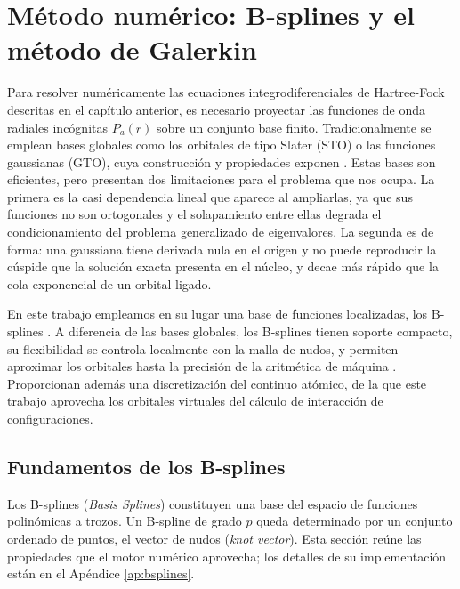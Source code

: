 \chapter{Método numérico: B-splines y el método de Galerkin}
\label{ch:bsplines-galerkin}

Para resolver numéricamente las ecuaciones integrodiferenciales de Hartree-Fock descritas en el capítulo anterior, es necesario proyectar las funciones de onda radiales incógnitas $P_a(r)$ sobre un conjunto base finito. Tradicionalmente se emplean bases globales como los orbitales de tipo Slater (STO) o las funciones gaussianas (GTO), cuya construcción y propiedades exponen \textcite{Szabo1989}. Estas bases son eficientes, pero presentan dos limitaciones para el problema que nos ocupa. La primera es la casi dependencia lineal que aparece al ampliarlas, ya que sus funciones no son ortogonales y el solapamiento entre ellas degrada el condicionamiento del problema generalizado de eigenvalores. La segunda es de forma: una gaussiana tiene derivada nula en el origen y no puede reproducir la cúspide que la solución exacta presenta en el núcleo, y decae más rápido que la cola exponencial de un orbital ligado.

En este trabajo empleamos en su lugar una base de funciones localizadas, los B-splines \parencite{deBoor1978}. A diferencia de las bases globales, los B-splines tienen soporte compacto, su flexibilidad se controla localmente con la malla de nudos, y permiten aproximar los orbitales hasta la precisión de la aritmética de máquina \parencite{Bachau2001}. Proporcionan además una discretización del continuo atómico, de la que este trabajo aprovecha los orbitales virtuales del cálculo de interacción de configuraciones.

\section{Fundamentos de los B-splines}

Los B-splines (\textit{Basis Splines}) constituyen una base del espacio de funciones polinómicas a trozos. Un B-spline de grado $p$ queda determinado por un conjunto ordenado de puntos, el vector de nudos (\textit{knot vector}). Esta sección reúne las propiedades que el motor numérico aprovecha; los detalles de su implementación están en el Apéndice \ref{ap:bsplines}.

